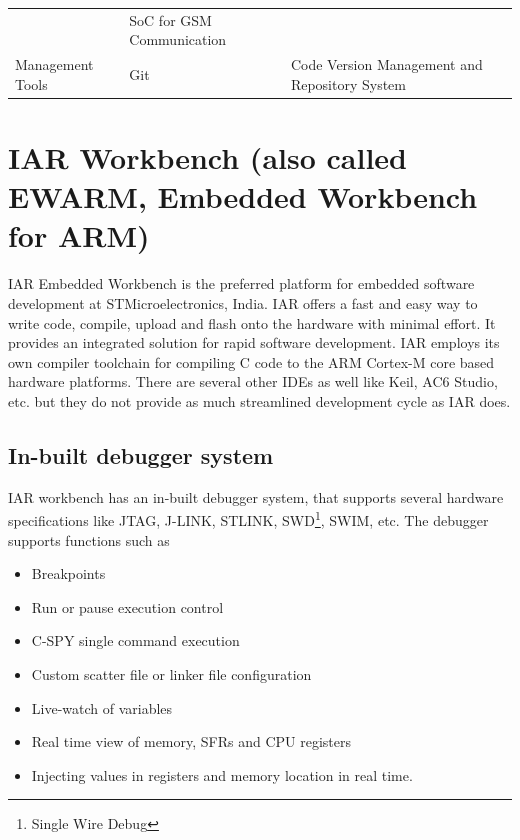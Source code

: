 \documentclass[]{book}
\providecommand{\tightlist}{%
  \setlength{\itemsep}{0pt}\setlength{\parskip}{0pt}}
\begin{document}
\begin{longtable}[]{@{}lll@{}}
\begin{minipage}[t]{0.13\columnwidth}
\end{minipage} & \begin{minipage}[t]{0.64\columnwidth}\raggedright\strut
SoC for GSM Communication\strut
\end{minipage}\tabularnewline
\begin{minipage}[t]{0.13\columnwidth}\raggedright\strut
Management Tools\strut
\end{minipage} & \begin{minipage}[t]{0.13\columnwidth}\raggedright\strut
Git\strut
\end{minipage} & \begin{minipage}[t]{0.64\columnwidth}\raggedright\strut
Code Version Management and Repository System\strut
\end{minipage}\tabularnewline
\bottomrule
\end{longtable}

\section{IAR Workbench (also called EWARM, Embedded Workbench for
ARM)}\label{iar-workbench-also-called-ewarm-embedded-workbench-for-arm}

IAR Embedded Workbench is the preferred platform for embedded software
development at STMicroelectronics, India. IAR offers a fast and easy way
to write code, compile, upload and flash onto the hardware with minimal
effort. It provides an integrated solution for rapid software
development. IAR employs its own compiler toolchain for compiling C code
to the ARM Cortex-M core based hardware platforms. There are several
other IDEs as well like Keil, AC6 Studio, etc. but they do not provide
as much streamlined development cycle as IAR does.

\subsection{In-built debugger system}\label{in-built-debugger-system}

IAR workbench has an in-built debugger system, that supports several
hardware specifications like JTAG, J-LINK, STLINK, SWD\footnote{Single Wire Debug},
SWIM, etc. The debugger supports functions such as

\begin{itemize}
\tightlist
\item
  Breakpoints
\item
  Run or pause execution control
\item
  C-SPY single command execution
\item
  Custom scatter file or linker file configuration
\item
  Live-watch of variables
\item
  Real time view of memory, SFRs and CPU registers
\item
  Injecting values in registers and memory location in real time.
\end{itemize}
\end{document}
